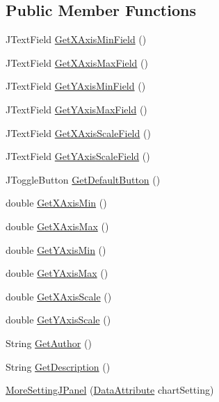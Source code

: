 \subsection*{Public Member Functions}
\begin{DoxyCompactItemize}
\item 
J\-Text\-Field \hyperlink{class_more_setting_j_panel_a55adb7a6be529276552eb98cb3c76fd0}{Get\-X\-Axis\-Min\-Field} ()
\item 
J\-Text\-Field \hyperlink{class_more_setting_j_panel_ae412bd3a66df2b14af9aae95c6ee55d8}{Get\-X\-Axis\-Max\-Field} ()
\item 
J\-Text\-Field \hyperlink{class_more_setting_j_panel_a451f95a3e1c0231aded2bf8fa3b4421d}{Get\-Y\-Axis\-Min\-Field} ()
\item 
J\-Text\-Field \hyperlink{class_more_setting_j_panel_ab524a65ef89a39d61e7033e7495a53c4}{Get\-Y\-Axis\-Max\-Field} ()
\item 
J\-Text\-Field \hyperlink{class_more_setting_j_panel_ab091eb7f112297574ccd612011b91e73}{Get\-X\-Axis\-Scale\-Field} ()
\item 
J\-Text\-Field \hyperlink{class_more_setting_j_panel_a13bfe944b0b4a671dc37c1c87381024d}{Get\-Y\-Axis\-Scale\-Field} ()
\item 
J\-Toggle\-Button \hyperlink{class_more_setting_j_panel_ab1f181103d7e162919eb257a3b0d04ca}{Get\-Default\-Button} ()
\item 
double \hyperlink{class_more_setting_j_panel_a497d4195007c03bfd6dbf909904f001d}{Get\-X\-Axis\-Min} ()
\item 
double \hyperlink{class_more_setting_j_panel_a2de92046bd03e4d6173acf6528439f53}{Get\-X\-Axis\-Max} ()
\item 
double \hyperlink{class_more_setting_j_panel_a81ac83574297de3b0cce60b91af661ef}{Get\-Y\-Axis\-Min} ()
\item 
double \hyperlink{class_more_setting_j_panel_a3d22ee97ad0adefd68746ac67630861f}{Get\-Y\-Axis\-Max} ()
\item 
double \hyperlink{class_more_setting_j_panel_afb3b2d456021f75e7d5ca438da32c5ad}{Get\-X\-Axis\-Scale} ()
\item 
double \hyperlink{class_more_setting_j_panel_ae137e83634e54fdca50c6cfeff6e451e}{Get\-Y\-Axis\-Scale} ()
\item 
String \hyperlink{class_more_setting_j_panel_a3940f844aa7de03b4607a3ce010eaa1f}{Get\-Author} ()
\item 
String \hyperlink{class_more_setting_j_panel_a02e5419e3a676912f28da9c6bbebc464}{Get\-Description} ()
\item 
\hyperlink{class_more_setting_j_panel_ac87617b1baff19cf09ecf2d713b4b368}{More\-Setting\-J\-Panel} (\hyperlink{class_data_attribute}{Data\-Attribute} chart\-Setting)
\end{DoxyCompactItemize}
